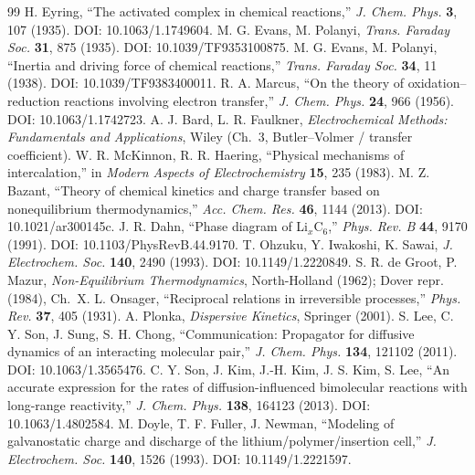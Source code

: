 \documentclass[11pt,a4paper]{article}
\begin{document}
\begin{thebibliography}{99}
 H. Eyring, ``The activated complex in chemical reactions,''
  \emph{J. Chem. Phys.} \textbf{3}, 107 (1935). DOI: 10.1063/1.1749604.
 M. G. Evans, M. Polanyi, \emph{Trans. Faraday Soc.}
  \textbf{31}, 875 (1935). DOI: 10.1039/TF9353100875.
 M. G. Evans, M. Polanyi, ``Inertia and driving force of
  chemical reactions,'' \emph{Trans. Faraday Soc.} \textbf{34}, 11 (1938). DOI:
  10.1039/TF9383400011.
 R. A. Marcus, ``On the theory of oxidation--reduction reactions
  involving electron transfer,'' \emph{J. Chem. Phys.} \textbf{24}, 966 (1956). DOI:
  10.1063/1.1742723.
 A. J. Bard, L. R. Faulkner, \emph{Electrochemical Methods:
  Fundamentals and Applications}, Wiley (Ch.~3, Butler--Volmer / transfer coefficient).
 W. R. McKinnon, R. R. Haering, ``Physical mechanisms of
  intercalation,'' in \emph{Modern Aspects of Electrochemistry} \textbf{15}, 235 (1983).
 M. Z. Bazant, ``Theory of chemical kinetics and charge transfer
  based on nonequilibrium thermodynamics,'' \emph{Acc. Chem. Res.} \textbf{46}, 1144
  (2013). DOI: 10.1021/ar300145c.
 J. R. Dahn, ``Phase diagram of Li$_x$C$_6$,'' \emph{Phys. Rev. B}
  \textbf{44}, 9170 (1991). DOI: 10.1103/PhysRevB.44.9170.
 T. Ohzuku, Y. Iwakoshi, K. Sawai, \emph{J. Electrochem. Soc.}
  \textbf{140}, 2490 (1993). DOI: 10.1149/1.2220849.
 S. R. de Groot, P. Mazur, \emph{Non-Equilibrium
  Thermodynamics}, North-Holland (1962); Dover repr. (1984), Ch.~X.
 L. Onsager, ``Reciprocal relations in irreversible processes,''
  \emph{Phys. Rev.} \textbf{37}, 405 (1931).
 A. Plonka, \emph{Dispersive Kinetics}, Springer (2001).
 S. Lee, C. Y. Son, J. Sung, S. H. Chong, ``Communication:
  Propagator for diffusive dynamics of an interacting molecular pair,'' \emph{J. Chem.
  Phys.} \textbf{134}, 121102 (2011). DOI: 10.1063/1.3565476.
 C. Y. Son, J. Kim, J.-H. Kim, J. S. Kim, S. Lee, ``An accurate
  expression for the rates of diffusion-influenced bimolecular reactions with
  long-range reactivity,'' \emph{J. Chem. Phys.} \textbf{138}, 164123 (2013). DOI:
  10.1063/1.4802584.
 M. Doyle, T. F. Fuller, J. Newman, ``Modeling of galvanostatic
  charge and discharge of the lithium/polymer/insertion cell,'' \emph{J. Electrochem.
  Soc.} \textbf{140}, 1526 (1993). DOI: 10.1149/1.2221597.

\end{thebibliography}
\end{document}
